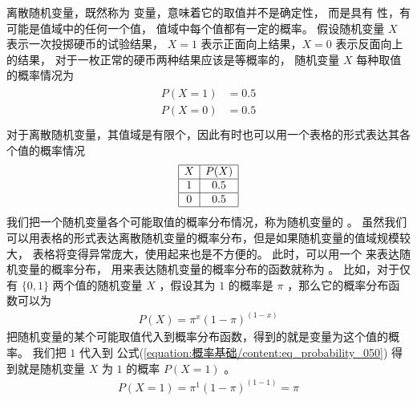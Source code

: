 \documentclass[letterpaper,10pt,english]{sphinxmanual}
\begin{document}
离散随机变量，既然称为  变量，意味着它的取值并不是确定性，
而是具有  性，有可能是值域中的任何一个值，
值域中每个值都有一定的概率。
假设随机变量 \(X\) 表示一次投掷硬币的试验结果，
\(X=1\) 表示正面向上结果，\(X=0\) 表示反面向上的结果，
对于一枚正常的硬币两种结果应该是等概率的，
随机变量 \(X\) 每种取值的概率情况为
\begin{align}\label{equation:概率基础/content:概率基础/content:26}\!\begin{aligned}
P(X=1) &= 0.5\\
P(X=0) &= 0.5\\
\end{aligned}\end{align}
对于离散随机变量，其值域是有限个，因此有时也可以用一个表格的形式表达其各个值的概率情况
\begin{equation}\label{equation:概率基础/content:概率基础/content:27}
\begin{split}\begin{array}{|c|c|} \hline
X & P(X) \\\hline
1 & 0.5  \\\hline
0 & 0.5  \\\hline
\end{array}\end{split}
\end{equation}
我们把一个随机变量各个可能取值的概率分布情况，称为随机变量的 。
虽然我们可以用表格的形式表达离散随机变量的概率分布，但是如果随机变量的值域规模较大，
表格将变得异常庞大，使用起来也是不方便的。
此时，可以用一个  来表达随机变量的概率分布，
用来表达随机变量的概率分布的函数就称为  。
比如，对于仅有 \(\{0,1\}\) 两个值的随机变量 \(X\)
，假设其为 \(1\) 的概率是 \(\pi\)
，那么它的概率分布函数可以为
\begin{equation}\label{equation:概率基础/content:eq_probability_050}
\begin{split}P(X) = \pi^x(1-\pi)^{(1-x)}\end{split}
\end{equation}
把随机变量的某个可能取值代入到概率分布函数，得到的就是变量为这个值的概率。
我们把 \(1\) 代入到 公式(\ref{equation:概率基础/content:eq_probability_050}) 得到就是随机变量 \(X\)
为 \(1\) 的概率 \(P(X=1)\) 。
\begin{equation}\label{equation:概率基础/content:概率基础/content:28}
\begin{split}P(X=1) = \pi^1(1-\pi)^{(1-1)}= \pi\end{split}
\end{equation}
\end{document}
